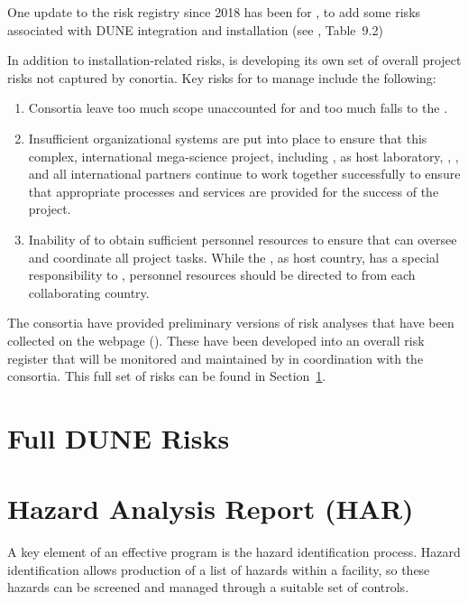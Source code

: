 One update to the risk registry since 2018 has been for , to add %
some risks  associated with  DUNE  integration and  installation  %
(see \spchinstall{}, Table~9.2)

In addition to installation-related risks,  is developing its
own set of overall project risks not captured by conortia.  Key risks
for  to manage include the following:
\begin{enumerate}
\item Consortia leave too much scope unaccounted for and too much falls
  to  the .
\item Insufficient organizational systems are put into place to
  ensure that this complex, international mega-science project,
  including ,  as host laboratory, , , and all international
  partners continue to work together successfully to ensure that 
  appropriate processes and services are provided for the success of
  the project.
\item Inability of  to obtain sufficient personnel resources to
  ensure that  can oversee and coordinate all project tasks.  While the , 
  as host country, has a special responsibility to , personnel resources should
  be directed to  from each collaborating country. 
\end{enumerate}

The consortia have provided preliminary versions of risk analyses that
have been collected on the  webpage (). These have
been developed into an overall risk register that will be monitored
and maintained by  in coordination with the consortia. This
full set of risks can be found in 
Section~\ref{sec:fdsp-app-risk}.


\section{Full DUNE Risks}
\label{sec:fdsp-app-risk}



\section{Hazard Analysis Report (HAR)}
\label{sec:fdsp-har}

A key element of an effective  program is the hazard
identification process. Hazard identification allows production of a
list of hazards within a facility, so these hazards can be screened
and managed through a suitable set of controls.

